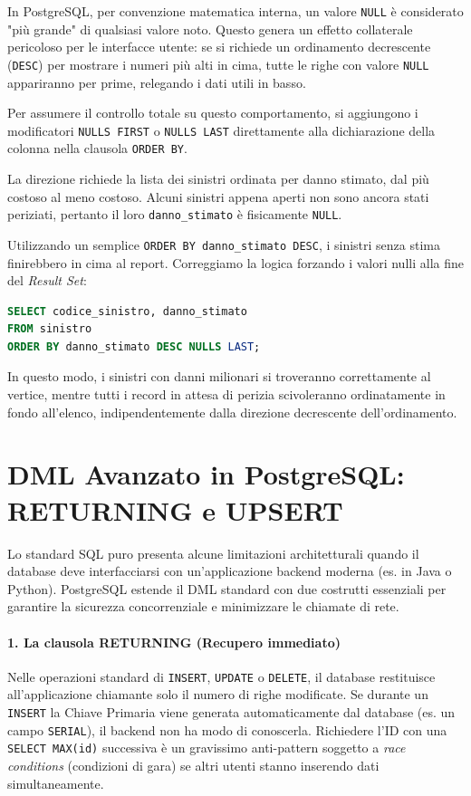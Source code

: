 In PostgreSQL, per convenzione matematica interna, un valore \texttt{NULL} è considerato "più grande" di qualsiasi valore noto. Questo genera un effetto collaterale pericoloso per le interfacce utente: se si richiede un ordinamento decrescente (\texttt{DESC}) per mostrare i numeri più alti in cima, tutte le righe con valore \texttt{NULL} appariranno per prime, relegando i dati utili in basso.

Per assumere il controllo totale su questo comportamento, si aggiungono i modificatori \texttt{NULLS FIRST} o \texttt{NULLS LAST} direttamente alla dichiarazione della colonna nella clausola \texttt{ORDER BY}.

\begin{example}
La direzione richiede la lista dei sinistri ordinata per danno stimato, dal più costoso al meno costoso. Alcuni sinistri appena aperti non sono ancora stati periziati, pertanto il loro \texttt{danno\_stimato} è fisicamente \texttt{NULL}. 

Utilizzando un semplice \texttt{ORDER BY danno\_stimato DESC}, i sinistri senza stima finirebbero in cima al report. Correggiamo la logica forzando i valori nulli alla fine del \textit{Result Set}:

\begin{lstlisting}[language=SQL, basicstyle=\ttfamily\small, keywordstyle=\color{blue}\bfseries]
SELECT codice_sinistro, danno_stimato
FROM sinistro
ORDER BY danno_stimato DESC NULLS LAST;
\end{lstlisting}
In questo modo, i sinistri con danni milionari si troveranno correttamente al vertice, mentre tutti i record in attesa di perizia scivoleranno ordinatamente in fondo all'elenco, indipendentemente dalla direzione decrescente dell'ordinamento.
\end{example}

\section{DML Avanzato in PostgreSQL: RETURNING e UPSERT}

Lo standard SQL puro presenta alcune limitazioni architetturali quando il database deve interfacciarsi con un'applicazione backend moderna (es. in Java o Python). PostgreSQL estende il DML standard con due costrutti essenziali per garantire la sicurezza concorrenziale e minimizzare le chiamate di rete.

\paragraph{1. La clausola RETURNING (Recupero immediato)}
Nelle operazioni standard di \texttt{INSERT}, \texttt{UPDATE} o \texttt{DELETE}, il database restituisce all'applicazione chiamante solo il numero di righe modificate. Se durante un \texttt{INSERT} la Chiave Primaria viene generata automaticamente dal database (es. un campo \texttt{SERIAL}), il backend non ha modo di conoscerla.
Richiedere l'ID con una \texttt{SELECT MAX(id)} successiva è un gravissimo anti-pattern soggetto a \textit{race conditions} (condizioni di gara) se altri utenti stanno inserendo dati simultaneamente.

